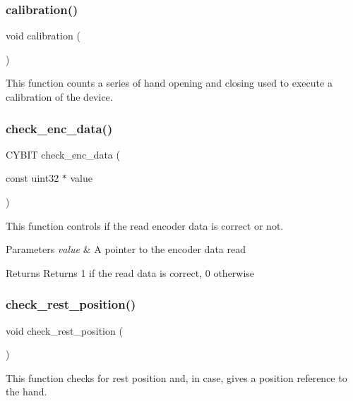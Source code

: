 \subsubsection{calibration()}
{\footnotesize\ttfamily void calibration (\begin{DoxyParamCaption}{ }\end{DoxyParamCaption})}

This function counts a series of hand opening and closing used to execute a calibration of the device. \mbox{\label{utils_8h_ae7faec5b3a1d000c90f70abfc1dfca92}} 
\subsubsection{check\+\_\+enc\+\_\+data()}
{\footnotesize\ttfamily C\+Y\+B\+IT check\+\_\+enc\+\_\+data (\begin{DoxyParamCaption}\item[{const uint32 $\ast$}]{value }\end{DoxyParamCaption})}

This function controls if the read encoder data is correct or not.


\begin{DoxyParams}{Parameters}
{\em value} & A pointer to the encoder data read\\
\hline
\end{DoxyParams}
\begin{DoxyReturn}{Returns}
Returns 1 if the read data is correct, 0 otherwise 
\end{DoxyReturn}
\mbox{\label{utils_8h_a2cb024aea0170c085d18670f5a851df8}} 
\subsubsection{check\+\_\+rest\+\_\+position()}
{\footnotesize\ttfamily void check\+\_\+rest\+\_\+position (\begin{DoxyParamCaption}{ }\end{DoxyParamCaption})}

This function checks for rest position and, in case, gives a position reference to the hand. \mbox{\label{utils_8h_a26a940f426cb9610d30c90d8378a9bcf}} 
